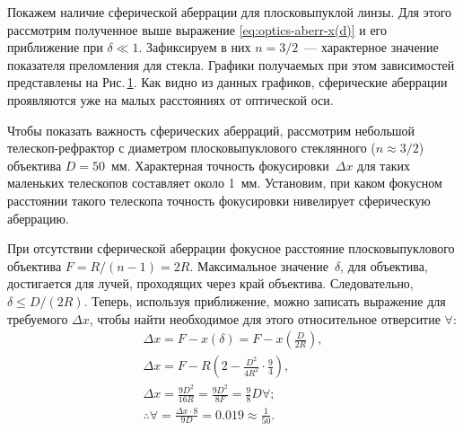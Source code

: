 \begin{figure}
	\centering
	\vspace{-.5pc}
	\caption{}
	\label{pic:sphere-aberrations-lens-plot}
\end{figure}
Покажем наличие сферической аберрации для плосковыпуклой линзы. Для этого рассмотрим полученное выше выражение \eqref{eq:optics-aberr-x(d)} и его приближение при $\delta \ll 1$. Зафиксируем в них $n=3/2$~--- характерное значение показателя преломления для стекла. Графики получаемых при этом зависимостей представлены на Рис.\,\ref{pic:sphere-aberrations-lens-plot}. Как видно из данных графиков, сферические аберрации проявляются уже на малых расстояниях от оптической оси.

Чтобы показать важность сферических аберраций, рассмотрим небольшой телескоп-рефрактор с диаметром плос\-ко\-вы\-пук\-ло\-во\-го стеклянного ($n \approx 3/2$) объектива $D = 50$~мм. Характерная точность фокусировки~$\Delta x$ для таких маленьких телескопов составляет около 1~мм. Установим, при каком фокусном расстоянии такого телескопа точность фокусировки нивелирует сферическую аберрацию.

При отсутствии сферической аберрации фокусное расстояние плосковыпуклового объектива $F = R/(n-1) = 2R$. Максимальное значение~$\delta$, для объектива, достигается для лучей, проходящих через край объектива. Следовательно, $\delta \leqslant D/(2R)$. Теперь, используя приближение, можно записать выражение для требуемого $\Delta x$, чтобы найти необходимое для этого относительное отверситие $\forall$:
\begin{gather*}
	\Delta x = F - x(\delta) = F - x\left( \frac{D}{2R} \right),\\
	\Delta x = F - R\left( 2 - \frac{D^2}{4R^2} \cdot \frac{9}{4} \right),\\
	\Delta x = \frac{9D^2}{16R} = \frac{9D^2}{8F} = \frac{9}{8} D \forall;\\
	\therefore \forall = \frac{\Delta x \cdot 8}{9D} = 0.019 \approx \frac{1}{50}.
\end{gather*}

